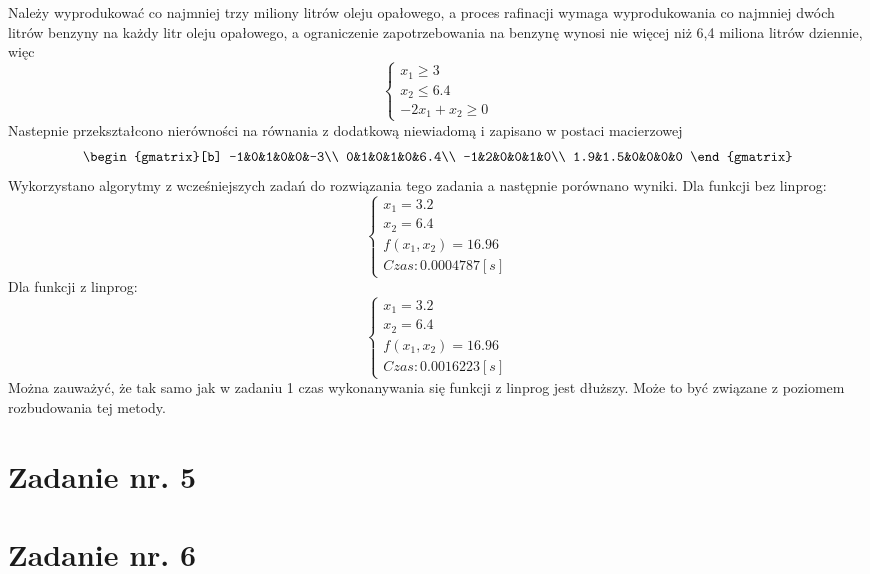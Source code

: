 \documentclass{article}
\begin{document}
Należy wyprodukować co najmniej trzy miliony litrów oleju opałowego, a proces rafinacji wymaga wyprodukowania co najmniej dwóch litrów
benzyny na każdy litr oleju opałowego, a ograniczenie zapotrzebowania na benzynę wynosi nie więcej niż 6,4 miliona litrów dziennie, więc
\begin{equation}
    \begin{cases}
        x_1 \geq 3\\
        x_2 \leq 6.4\\
        -2x_1 + x_2 \geq 0
    \end{cases}
\end{equation}
Nastepnie przekształcono nierówności na równania z dodatkową niewiadomą i zapisano w postaci macierzowej
\begin{equation}
  \begin{gmatrix}[b]
    -1&0&1&0&0&-3\\
    0&1&0&1&0&6.4\\
    -1&2&0&0&1&0\\
    1.9&1.5&0&0&0&0
  \end{gmatrix}
\end{equation}
Wykorzystano algorytmy z wcześniejszych zadań do rozwiązania tego zadania a następnie porównano wyniki.
\newline Dla funkcji bez linprog:
\begin{equation}
  \begin{cases}
      x_1 = 3.2\\
      x_2 = 6.4\\
      f(x_1,x_2)=16.96\\
      Czas: 0.0004787[s]
  \end{cases}
\end{equation}
Dla funkcji z linprog:
\begin{equation}
  \begin{cases}
      x_1 = 3.2\\
      x_2 = 6.4\\
      f(x_1,x_2)=16.96\\
      Czas: 0.0016223[s]
  \end{cases}
\end{equation}
Można zauważyć, że tak samo jak w zadaniu 1 czas wykonanywania się funkcji z linprog jest dłuższy. Może to być związane z poziomem rozbudowania tej metody.
\section{Zadanie nr. 5}

\section{Zadanie nr. 6}
\end{document}
